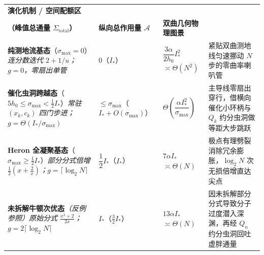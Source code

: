 \documentclass[11pt,a4paper]{ctexart}
\theoremstyle{plain}
\theoremstyle{definition}
\newcommand{\cA}{\mathcal{A}}
\newcommand{\Saux}{\Sigma_{\mathrm{aux}}}
\newcommand{\Stot}{\Sigma_{\mathrm{total}}}
\begin{document}
\begin{center}
\footnotesize
\renewcommand{\arraystretch}{1.45}
\setlength{\tabcolsep}{4pt}
\begin{tabularx}{\textwidth}{@{}>{\raggedright\arraybackslash}p{3.5cm}
  >{\centering\arraybackslash}p{3.1cm}
  >{\centering\arraybackslash}p{3.3cm}
  >{\raggedright\arraybackslash}X@{}}
\toprule
\textbf{演化机制 / 空间配额区} & \shortstack{\textbf{横向催化通量 $\Saux$}\\\textbf{（峰值总通量 $\Stot$）}} & \textbf{纵向总作用量 $\cA$} & \textbf{双曲几何物理图景} \\
\midrule
\textbf{纯测地流基态}\newline（$\sigma_{\max} = 0$）\newline\textit{连分数迭代 $2 + 1/u$；$g = 0$，零扇出单管}
& $0$\newline（$I_*$）
& $\dfrac{3\alpha}{2 h_0} I_*^2$\newline $\asymp \Theta(N^2)$
& 紧贴双曲测地线匀速挪动 $N$ 步的零曲率喇叭管 \\
\addlinespace
\textbf{催化虫洞跨越态}\newline（$5h_0 \le \sigma_{\max} < \frac{1}{2}I_*$）\newline\textit{常驻 $(x_k, c_k)$ 四门步进；$g = \Theta(I_*/\sigma_{\max})$}
& $\le \sigma_{\max}$\newline（$I_* + O(\sigma_{\max})$）
& $\Theta\!\left(\dfrac{\alpha I_*^2}{\sigma_{\max}}\right)$
& 主导线零扇出穿行，借横向催化小环柄与 $Q_k$ 约分虫洞做等距大步跳跃 \\
\addlinespace
\textbf{Heron 全凝聚基态}\newline（$\sigma_{\max} \ge \frac{1}{2}I_*$）\newline\textit{部分分式倍增 $\frac{1}{2}(x + \frac{2}{x})$；$g = \lceil \log_2 N \rceil$}
& $\dfrac{1}{2} I_*$\newline（$I_*$）
& $7\alpha I_*$\newline $\asymp \Theta(N)$
& 极点有理劈裂消除冗余膨胀，$\log_2 N$ 次无损倍增直达尖点 \\
\addlinespace
\textbf{未拆解牛顿次优态}\newline\textit{（反例参照）}\newline\textit{原始分式 $\frac{x^2+2}{2x}$；$g = 2\lceil \log_2 N \rceil$}
& $I_*$\newline（$\frac{3}{2} I_*$）
& $13\alpha I_*$\newline $\asymp \Theta(N)$
& 因未拆解部分分式导致分子过度潜入深渊，再经 $Q_n$ 约分虫洞回吐虚胖通量 \\
\bottomrule
\end{tabularx}
\label{tab:mechanisms}
\end{center}
\end{document}
